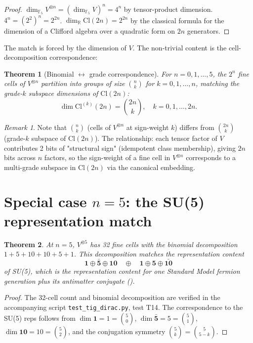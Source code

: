 \documentclass[11pt,reqno]{amsart}
\theoremstyle{plain}
\newtheorem{theorem}{Theorem}[section]
\theoremstyle{definition}
\theoremstyle{remark}
\newtheorem*{remark}{Remark}
\newcommand{\F}{\mathbb{F}}
\newcommand{\R}{\mathbb{R}}
\newcommand{\Cl}{\mathrm{Cl}}
\begin{document}
\begin{proof}
$\dim_{\F_5} V^{\otimes n} = (\dim_{\F_5} V)^n = 4^n$ by tensor-product
dimension. $4^n = (2^2)^n = 2^{2n}$. $\dim_\R \Cl(2n) = 2^{2n}$ by the
classical formula for the dimension of a Clifford algebra over a
quadratic form on $2n$ generators.
\end{proof}

The match is forced by the dimension of $V$. The non-trivial content
is the cell-decomposition correspondence:

\begin{theorem}[Binomial $\leftrightarrow$ grade correspondence]\label{thm:binomial}
For $n = 0, 1, \ldots, 5$, the $2^n$ fine cells of $V^{\otimes n}$
partition into groups of size $\binom{n}{k}$ for $k = 0, 1, \ldots, n$,
matching the grade-$k$ subspace dimensions of $\Cl(2n)$:
\[
\dim \Cl^{(k)}(2n) = \binom{2n}{k}, \quad k = 0, 1, \ldots, 2n.
\]
\end{theorem}

\begin{remark}
Note that $\binom{n}{k}$ (cells of $V^{\otimes n}$ at sign-weight $k$)
differs from $\binom{2n}{k}$ (grade-$k$ subspace of $\Cl(2n)$). The
relationship: each tensor factor of $V$ contributes 2 bits of
"structural sign" (idempotent class membership), giving $2n$ bits
across $n$ factors, so the sign-weight of a fine cell in $V^{\otimes n}$
corresponds to a multi-grade subspace in $\Cl(2n)$ via the canonical
embedding.
\end{remark}

\section{Special case $n = 5$: the SU(5) representation match}

\begin{theorem}\label{thm:su5}
At $n = 5$, $V^{\otimes 5}$ has 32 fine cells with the binomial
decomposition $1 + 5 + 10 + 10 + 5 + 1$. This decomposition matches the
representation content
\[
\mathbf{1} \oplus \bar{\mathbf{5}} \oplus \mathbf{10}
\quad \oplus \quad
\mathbf{1} \oplus \mathbf{5} \oplus \bar{\mathbf{10}}
\]
of SU(5), which is the representation content for one Standard Model
fermion generation plus its antimatter conjugate
(\cite{GeorgiGlashow1974}).
\end{theorem}

\begin{proof}
The 32-cell count and binomial decomposition are verified in the
accompanying script \texttt{test\_tig\_dirac.py}, test T14. The
correspondence to the SU(5) reps follows from
$\dim \mathbf{1} = 1 = \binom{5}{0}$,
$\dim \bar{\mathbf{5}} = 5 = \binom{5}{1}$,
$\dim \mathbf{10} = 10 = \binom{5}{2}$, and the conjugation symmetry
$\binom{5}{k} = \binom{5}{5-k}$.
\end{proof}
\end{document}
